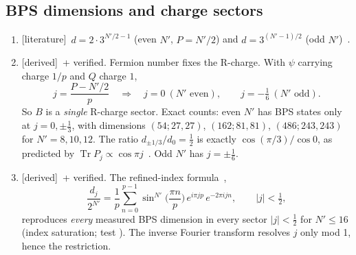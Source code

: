 \documentclass[11pt]{article}
\newcommand{\Tr}{\operatorname{Tr}}
\newcommand{\Np}{N'}
\newcommand{\tagbox}[2]{\textsf{\small\color{#1}[#2]}}
\newcommand{\EST}{\tagbox{cest}{literature}}
\newcommand{\DER}{\tagbox{cder}{derived}}
\theoremstyle{remark}
\begin{document}
\subsection{BPS dimensions and charge sectors}\label{sec:sectors}
\begin{enumerate}\itemsep2pt
\item \EST\ $d=2\cdot3^{\Np/2-1}$ (even $\Np$, $P=\Np/2$) and $d=3^{(\Np-1)/2}$ (odd $\Np$)~\cite{CV}.
\item \DER\ + verified. Fermion number fixes the R-charge. With $\psi$ carrying charge $1/p$ and $Q$ charge $1$,
\begin{equation}
j=\frac{P-\Np/2}{p}\quad\Rightarrow\quad j=0\ (\Np\text{ even}),\qquad j=-\tfrac16\ (\Np\text{ odd}).
\label{eq:jsector}
\end{equation}
So $B$ is a \emph{single} R-charge sector. Exact counts: even $\Np$ has BPS states only at $j=0,\pm\frac13$, with
dimensions $(54;27,27)$, $(162;81,81)$, $(486;243,243)$ for $\Np=8,10,12$. The ratio $d_{\pm1/3}/d_0=\tfrac12$ is
exactly $\cos(\pi/3)/\cos0$, as predicted by $\Tr P_j\propto\cos\pi j$~\cite[eq.~82]{LMRS}. Odd $\Np$ has
$j=\pm\frac16$.
\item \DER\ + verified. The refined-index formula~\cite[eq.~A.4]{BLY},
\begin{equation}
\frac{d_j}{2^{\Np}}=\frac1p\sum_{n=0}^{p-1}\sin^{\Np}\!\Big(\frac{\pi n}{p}\Big)\,e^{i\pi jp}\,e^{-2\pi i jn},\qquad|j|<\tfrac12,
\label{eq:index}
\end{equation}
reproduces \emph{every} measured BPS dimension in every sector $|j|<\frac12$ for $\Np\le16$ (index saturation;
test ). The inverse Fourier transform resolves $j$ only mod 1, hence the restriction.
\end{enumerate}
\end{document}
